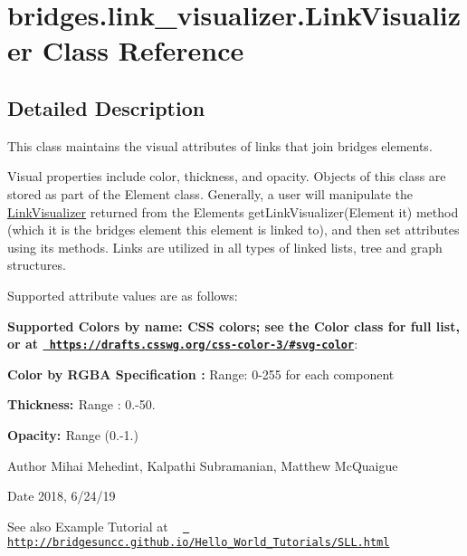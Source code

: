 \hypertarget{classbridges_1_1link__visualizer_1_1_link_visualizer}{}\section{bridges.\+link\+\_\+visualizer.\+Link\+Visualizer Class Reference}
\label{classbridges_1_1link__visualizer_1_1_link_visualizer}


\subsection{Detailed Description}
This class maintains the visual attributes of links that join bridges elements. 

Visual properties include color, thickness, and opacity. Objects of this class are stored as part of the Element class. Generally, a user will manipulate the \mbox{\hyperlink{classbridges_1_1link__visualizer_1_1_link_visualizer}{Link\+Visualizer}} returned from the Element\textquotesingle{}s get\+Link\+Visualizer(\+Element it) method (which it is the bridges element this element is linked to), and then set attributes using its methods. Links are utilized in all types of linked lists, tree and graph structures.

Supported attribute values are as follows\+:

{\bfseries{Supported Colors by name\+: C\+SS colors; see the Color class for full list, or at \href{https://drafts.csswg.org/css-color-3/\#svg-color}{\texttt{ https\+://drafts.\+csswg.\+org/css-\/color-\/3/\#svg-\/color}}}}\+: 

{\bfseries{ Color by R\+G\+BA Specification \+:}} Range\+: 0-\/255 for each component 

{\bfseries{ Thickness\+: }} Range \+: 0.-\/50.

{\bfseries{ Opacity\+: }} Range (0.-\/1.) 

\begin{DoxyAuthor}{Author}
Mihai Mehedint, Kalpathi Subramanian, Matthew Mc\+Quaigue
\end{DoxyAuthor}
\begin{DoxyDate}{Date}
2018, 6/24/19
\end{DoxyDate}
\begin{DoxySeeAlso}{See also}
Example Tutorial at ~\newline
 \href{http://bridgesuncc.github.io/Hello_World_Tutorials/SLL.html}{\texttt{ http\+://bridgesuncc.\+github.\+io/\+Hello\+\_\+\+World\+\_\+\+Tutorials/\+S\+L\+L.\+html}} 
\end{DoxySeeAlso}
